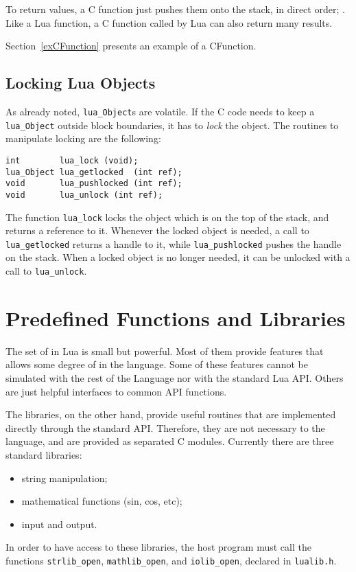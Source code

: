 To return values, a C function just pushes them onto the stack,
in direct order; .
Like a Lua function, a C function called by Lua can also return
many results.

Section~\ref{exCFunction} presents an example of a CFunction.


\subsection{Locking Lua Objects}

As already noted, \verb'lua_Object's are volatile.
If the C code needs to keep a \verb'lua_Object'
outside block boundaries,
it has to {\em lock} the object.
The routines to manipulate locking are the following:
\begin{verbatim}
int        lua_lock (void);
lua_Object lua_getlocked  (int ref);
void       lua_pushlocked (int ref);
void       lua_unlock (int ref);
\end{verbatim}
The function \verb'lua_lock' locks the object
which is on the top of the stack,
and returns a reference to it.
Whenever the locked object is needed,
a call to \verb'lua_getlocked'
returns a handle to it,
while \verb'lua_pushlocked' pushes the handle on the stack.
When a locked object is no longer needed,
it can be unlocked with a call to \verb'lua_unlock'.



\section{Predefined Functions and Libraries}

The set of  in Lua is small but powerful.
Most of them provide features that allows some degree of
 in the language.
Some of these features cannot be simulated with the rest of the
Language nor with the standard Lua API.
Others are just helpful interfaces to common API functions.

The libraries, on the other hand, provide useful routines
that are implemented directly through the standard API.
Therefore, they are not necessary to the language,
and are provided as separated C modules.
Currently there are three standard libraries:
\begin{itemize}
\item string manipulation;
\item mathematical functions (sin, cos, etc);
\item input and output.
\end{itemize}
In order to have access to these libraries,
the host program must call the functions
\verb-strlib_open-, \verb-mathlib_open-, and \verb-iolib_open-,
declared in \verb-lualib.h-.


